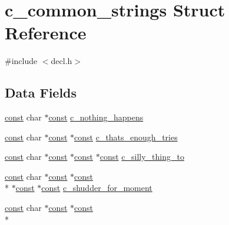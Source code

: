 \hypertarget{structc__common__strings}{\section{c\+\_\+common\+\_\+strings Struct Reference}
\label{structc__common__strings}
}


{\ttfamily \#include $<$decl.\+h$>$}

\subsection*{Data Fields}
\begin{DoxyCompactItemize}
\item 
\hyperlink{tradstdc_8h_a2c212835823e3c54a8ab6d95c652660e}{const} char $\ast$\hyperlink{tradstdc_8h_a2c212835823e3c54a8ab6d95c652660e}{const} \hyperlink{structc__common__strings_a7e7ac157e14bb8c42fea2407591e7687}{c\+\_\+nothing\+\_\+happens}
\item 
\hyperlink{tradstdc_8h_a2c212835823e3c54a8ab6d95c652660e}{const} char $\ast$\hyperlink{tradstdc_8h_a2c212835823e3c54a8ab6d95c652660e}{const} $\ast$\hyperlink{tradstdc_8h_a2c212835823e3c54a8ab6d95c652660e}{const} \hyperlink{structc__common__strings_a336294d5330f301bc2eddd71bd9059e9}{c\+\_\+thats\+\_\+enough\+\_\+tries}
\item 
\hyperlink{tradstdc_8h_a2c212835823e3c54a8ab6d95c652660e}{const} char $\ast$\hyperlink{tradstdc_8h_a2c212835823e3c54a8ab6d95c652660e}{const} $\ast$\hyperlink{tradstdc_8h_a2c212835823e3c54a8ab6d95c652660e}{const} $\ast$\hyperlink{tradstdc_8h_a2c212835823e3c54a8ab6d95c652660e}{const} \hyperlink{structc__common__strings_aeba96d6c0937a9dcba076c5634e324f6}{c\+\_\+silly\+\_\+thing\+\_\+to}
\item 
\hyperlink{tradstdc_8h_a2c212835823e3c54a8ab6d95c652660e}{const} char $\ast$\hyperlink{tradstdc_8h_a2c212835823e3c54a8ab6d95c652660e}{const} $\ast$\hyperlink{tradstdc_8h_a2c212835823e3c54a8ab6d95c652660e}{const} \\*
$\ast$\hyperlink{tradstdc_8h_a2c212835823e3c54a8ab6d95c652660e}{const} $\ast$\hyperlink{tradstdc_8h_a2c212835823e3c54a8ab6d95c652660e}{const} \hyperlink{structc__common__strings_a4bac587af4d082c8e91091d32fff01b8}{c\+\_\+shudder\+\_\+for\+\_\+moment}
\item 
\hyperlink{tradstdc_8h_a2c212835823e3c54a8ab6d95c652660e}{const} char $\ast$\hyperlink{tradstdc_8h_a2c212835823e3c54a8ab6d95c652660e}{const} $\ast$\hyperlink{tradstdc_8h_a2c212835823e3c54a8ab6d95c652660e}{const} \\*

\end{DoxyCompactItemize}
